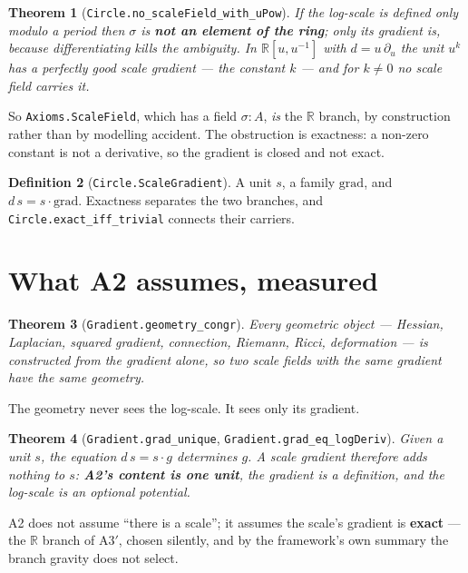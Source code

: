 \documentclass[11pt,a4paper]{article}
\newtheorem{theorem}{Theorem}[section]
\theoremstyle{definition}
\newtheorem{definition}[theorem]{Definition}
\theoremstyle{remark}
\newcommand{\lean}[1]{\texttt{\small #1}}
\newcommand{\sg}{\sigma}
\newcommand{\Athree}{\ensuremath{\mathrm{A3}'}}
\begin{document}
\begin{theorem}[\lean{Circle.no\_scaleField\_with\_uPow}]
If the log-scale is defined only modulo a period then $\sg$ is \textbf{not an
element of the ring}; only its gradient is, because differentiating kills the
ambiguity. In $\mathbb{R}[u,u^{-1}]$ with $d=u\,\partial_u$ the unit $u^{k}$ has a
perfectly good scale gradient --- the constant $k$ --- and for $k\neq0$ no scale
field carries it.
\end{theorem}

So \lean{Axioms.ScaleField}, which has a field $\sg:A$, \emph{is} the $\mathbb{R}$
branch, by construction rather than by modelling accident. The obstruction is
exactness: a non-zero constant is not a derivative, so the gradient is closed and
not exact.

\begin{definition}[\lean{Circle.ScaleGradient}]
A unit $s$, a family $\mathrm{grad}$, and $d\,s=s\cdot\mathrm{grad}$. Exactness
separates the two branches, and \lean{Circle.exact\_iff\_trivial} connects their
carriers.
\end{definition}

\section{What A2 assumes, measured}
\label{sec:gradient}

\begin{theorem}[\lean{Gradient.geometry\_congr}]
Every geometric object --- Hessian, Laplacian, squared gradient, connection,
Riemann, Ricci, deformation --- is constructed from the gradient alone, so two
scale fields with the same gradient have the same geometry.
\end{theorem}

\begin{claimbox}
The geometry never sees the log-scale. It sees only its gradient.
\end{claimbox}

\begin{theorem}[\lean{Gradient.grad\_unique}, \lean{Gradient.grad\_eq\_logDeriv}]
Given a unit $s$, the equation $d\,s=s\cdot g$ determines $g$. A scale gradient
therefore adds nothing to $s$: \textbf{A2's content is one unit}, the gradient is a
definition, and the log-scale is an \emph{optional potential}.
\end{theorem}

\begin{claimbox}
A2 does not assume ``there is a scale''; it assumes the scale's gradient is
\textbf{exact} --- the $\mathbb{R}$ branch of \Athree{}, chosen silently, and by
the framework's own summary the branch gravity does not select.
\end{claimbox}
\end{document}
